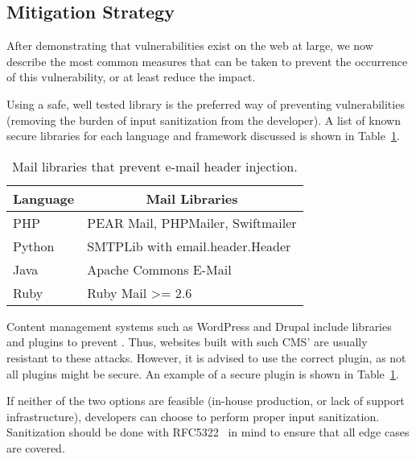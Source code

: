 \subsection{Mitigation Strategy}
\label{disc:mitigation}
After demonstrating that \ehi vulnerabilities exist on the web at large, we now describe the most common measures that can be taken to prevent the occurrence of this vulnerability, or at least reduce the impact.

Using a safe, well tested \email library is the preferred way of
preventing \ehi vulnerabilities (removing the burden of input
sanitization from the developer). A list of known secure libraries for
each language and framework discussed is shown in
Table~\ref{tab:maillib}.
	\begin{table}[tbp]
		\centering
		\scriptsize
		\begin{tabular}{|l|l|}
			\hline
			\multicolumn{1}{|c|}{\textbf{Language}} &
			\multicolumn{1}{c|}{\textbf{Mail Libraries}} \\
			\hline
			PHP & {{PEAR Mail\cite{Hagenbuch2016}, PHPMailer\cite{PHPMailer2016}, Swiftmailer\cite{SwiftMailer2016}}}\\
			\hline
			Python & SMTPLib with email.header.Header\\
			\hline
			Java & Apache Commons E-Mail\cite{ACE2016}\\
			\hline
			Ruby & Ruby Mail \textgreater{}= 2.6\cite{RubyMailGem2016}\\
			\hline
		\end{tabular}
		\caption[]{Mail libraries that prevent e-mail header
          injection.}
        \vspace{-5ex}        
		\label{tab:maillib}
	\end{table}

Content management systems such as WordPress and Drupal include
libraries and plugins to prevent \ehi. Thus, websites built with such
CMS' are usually resistant to these attacks. However, it is advised to
use the correct \email plugin, as not all plugins might be secure. An example of a secure plugin is shown in Table~\ref{tab:maillib}.

If neither of the two options are feasible (in-house
production, or lack of support infrastructure), developers can
choose to perform proper input sanitization. Sanitization should be
done with RFC5322~\cite{rfc5322} in mind to
ensure that all edge cases are covered.
	

